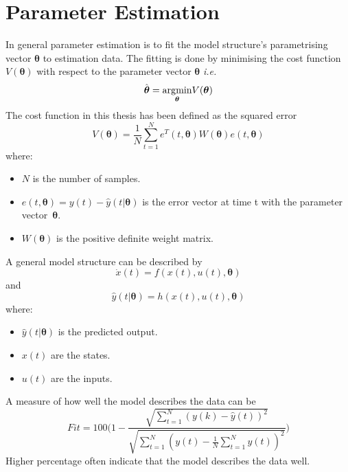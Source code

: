 \section{Parameter Estimation} 
In general parameter estimation is to fit the model structure's parametrising vector $\boldsymbol{\theta}$ to estimation data. The fitting is done by minimising the cost function $V(\boldsymbol{\theta})$ with respect to the parameter vector $\boldsymbol{\theta}$ \emph{i.e.}
\begin{equation}
\hat{\boldsymbol{\theta}} = \underset{\boldsymbol{\theta}}{\operatorname*{\arg\!\min}} V(\boldsymbol{\theta})
\end{equation}
The cost function in this thesis has been defined as the squared error
\begin{equation}
    V(\boldsymbol{\theta}) = \frac{1}{N} \sum_{t=1}^{N} e^T(t,\boldsymbol{\theta}) W(\boldsymbol{\theta})  e(t,\boldsymbol{\theta})
\end{equation}
where:
\begin{itemize}
    \item $N$ is the number of samples.
    \item $e(t,\boldsymbol{\theta}) = y(t) - \hat{y}(t|\boldsymbol{\theta})$ is the error vector at time t with the parameter vector~$\boldsymbol{\theta}$.
    \item $W(\boldsymbol{\theta})$ is the positive definite weight matrix.
\end{itemize}

A general model structure can be described by
\begin{equation}
\dot{x}(t) = f(x(t), u(t), \boldsymbol{\theta})
\end{equation}
and
\begin{equation}
\hat{y}(t|\boldsymbol{\theta}) = h(x(t), u(t), \boldsymbol{\theta})
\end{equation}
 where:
 \begin{itemize}
  \item $\hat{y}(t|\boldsymbol{\theta})$ is the predicted output.
  \item $x(t)$ are the states. 
  \item $u(t)$ are the inputs. 
 \end{itemize}
A measure of how well the model describes the data can be
\begin{equation}
Fit = 100 \Biggr(1 - \frac{\sqrt{\sum\limits_{t=1}^N (y(k) - \hat{y}(t))^2}}{\sqrt{\sum\limits_{t=1}^N(y(t)-\frac{1}{N}\sum\limits_{t=1}^N y(t))^2}}\Biggl)
\end{equation} 
Higher percentage often indicate that the model describes the data well. 
